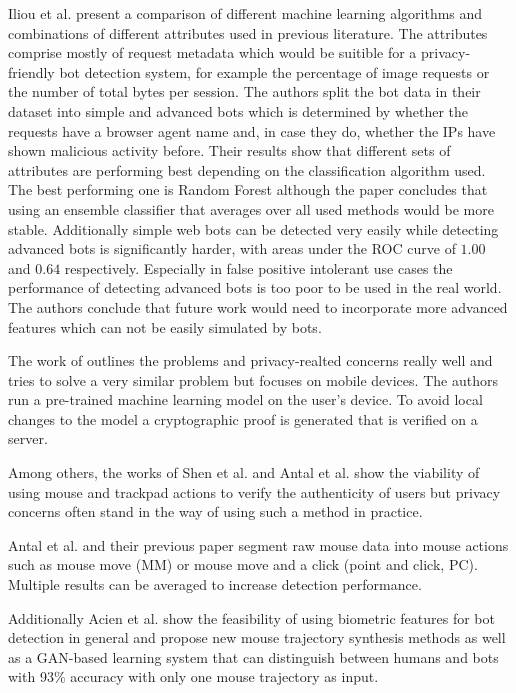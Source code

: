 \documentclass[
    fontsize=12pt,
    headings=small,
    parskip=half,           %
    bibliography=totoc,
    numbers=noenddot,       %
    open=any,               %
    final                   %
]{scrreprt}
\begin{document}
Iliou et al. \cite{10.1145/3339252.3339267} present a comparison of different machine learning algorithms and combinations of different attributes used in previous literature. The attributes comprise mostly of request metadata which would be suitible for a privacy-friendly bot detection system, for example the percentage of image requests or the number of total bytes per session. The authors split the bot data in their dataset into simple and advanced bots which is determined by whether the requests have a browser agent name and, in case they do, whether the IPs have shown malicious activity before. Their results show that different sets of attributes are performing best depending on the classification algorithm used. The best performing one is Random Forest although the paper concludes that using an ensemble classifier that averages over all used methods would be more stable. Additionally simple web bots can be detected very easily while detecting advanced bots is significantly harder, with areas under the ROC curve of $1.00$ and $0.64$ respectively. Especially in false positive intolerant use cases the performance of detecting advanced bots is too poor to be used in the real world. The authors conclude that future work would need to incorporate more advanced features which can not be easily simulated by bots.

The work of \cite{PETS2021} outlines the problems and privacy-realted concerns really well and tries to solve a very similar problem but focuses on mobile devices. The authors run a pre-trained machine learning model on the user's device. To avoid local changes to the model a cryptographic proof is generated that is verified on a server.

Among others, the works of Shen et al. \cite{6263955} and Antal et al. \cite{9111596} \cite{DBLP:journals/corr/abs-1810-04668} show the viability of using mouse and trackpad actions to verify the authenticity of users but privacy concerns often stand in the way of using such a method in practice.

Antal et al.\cite{9111596} and their previous paper\cite{DBLP:journals/corr/abs-1810-04668} segment raw mouse data into mouse actions such as mouse move (MM) or mouse move and a click (point and click, PC). Multiple results can be averaged to increase detection performance. 

Additionally Acien et al. \cite{Acien2020BeCAPTCHAMouseSM} show the feasibility of using biometric features for bot detection in general and propose new mouse trajectory synthesis methods as well as a GAN-based learning system that can distinguish between humans and bots with 93\% accuracy with only one mouse trajectory as input.
\end{document}
